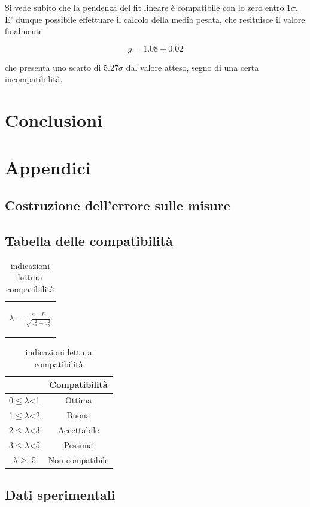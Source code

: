 \documentclass{article}
\begin{document}
	Si vede subito che la pendenza del fit lineare è compatibile con lo zero entro 1$\sigma$. E' dunque
	possibile effettuare il calcolo della media pesata, che resituisce il valore finalmente

	\[
		g = 1.08 \pm 0.02	
	\]
	
	che presenta uno scarto di 5.27$\sigma$ dal valore atteso, segno di una certa incompatibilità.

	\section*{Conclusioni}



	\newpage
	\appendix
	\section{Appendici}
	\label{appendice}
	\subsection{Costruzione dell'errore sulle misure}
	\label{Calcerr}

	\subsection{Tabella delle compatibilità}
	\medskip
	\begin{table}[H]
		\centering
		\begin{tabular}{c}
			\begin{Large}
			$\lambda=\frac{|a-b|}{\sqrt{\sigma_a^2+\sigma_b^2}}$
			\end{Large}\\
		\end{tabular}
		\hspace{0.5cm}
		\begin{tabular}{cc}
			\toprule
			&       \textbf{Compatibilità   }       \\
			\midrule
			0$\leq \lambda$<1   &Ottima                 \\
			1$\leq \lambda$<2   &Buona                  \\
			2$\leq \lambda$<3   &Accettabile            \\
			3$\leq\lambda$<5   &Pessima                \\
			$ \lambda \geq $  5     &Non compatibile        \\
			\bottomrule
		\end{tabular}
		\caption{indicazioni lettura compatibilità}
		\label{tab:compatibilità}
	\end{table}

	\subsection{Dati sperimentali}


   
\end{document}

